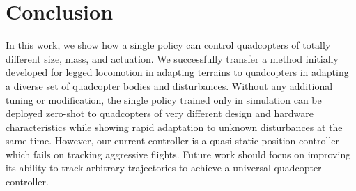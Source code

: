 \section{Conclusion}
In this work, we show how a single policy can control quadcopters of totally different size, mass, and actuation. 
%
We successfully transfer a method initially developed for legged locomotion in adapting terrains to quadcopters in adapting a diverse set of quadcopter bodies and disturbances.
%
Without any additional tuning or modification, the single policy trained only in simulation can be deployed zero-shot to quadcopters of very different design and hardware characteristics while showing rapid adaptation to unknown disturbances at the same time.
%
However, our current controller is a quasi-static position controller which fails on tracking aggressive flights. 
%
Future work should focus on improving its ability to track arbitrary trajectories to achieve a universal quadcopter controller. 
%
%
%
%
%
%
